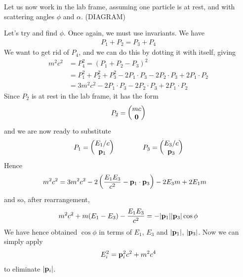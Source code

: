\documentclass{../../template/note}
\begin{document}
    Let us now work in the lab frame, assuming one particle is at rest, and with scattering angles \(\phi\) and \(\alpha\). (DIAGRAM) 
    
    Let's try and find \(\phi\). Once again, we must use invariants. We have
    \begin{align*}
        P_1 + P_2 = P_3 + P_4
    \end{align*}
    We want to get rid of \(P_4\), and we can do this by dotting it with itself, giving
    \begin{align*}
        m^2c^2 &= P_4^2 = (P_1 + P_2 - P_3)^2 \\
        &= P_1^2 + P_2^2 + P_3^2 - 2 P_1 \cdot P_3 - 2 P_2 \cdot P_3 + 2 P_1 \cdot P_2 \\
        &= 3m^2c^2 - 2 P_1 \cdot P_3 - 2 P_2 \cdot P_3 + 2 P_1 \cdot P_2
    \end{align*}
    Since \(P_2\) is at rest in the lab frame, it has the form
    \begin{align*}
        P_2 = \begin{pmatrix}
            mc \\
            \V 0 \\
        \end{pmatrix}
    \end{align*}
    and we are now ready to substitute
    \begin{align*}
        P_1 = \begin{pmatrix}
            E_1/c \\
            \V p_1 \\
        \end{pmatrix} \qquad \qquad P_3 = \begin{pmatrix}
            E_3/c \\
            \V p_3 \\
        \end{pmatrix}
    \end{align*}
    Hence
    \begin{align*}
        m^2c^2 &= 3m^2c^2 - 2 \left(\frac{E_1E_3}{c^2} - \V p_1 \cdot \V p_3\right) - 2 E_3m + 2E_1m
    \end{align*}
    and so, after rearrangement,
    \begin{align*}
        m^2c^2 + m(E_1-E_3) - \frac{E_1E_3}{c^2} = -|\V p_1||\V p_3| \cos \phi
    \end{align*}
    We have hence obtained \(\cos \phi\) in terms of \(E_1\), \(E_3\) and \(|\V p_1|\), \(|\V p_3|\). Now we can simply apply
    \begin{align*}
        E_i^2 = \V p_i^2 c^2 + m^2c^4
    \end{align*}
    to eliminate \(|\V p_i|\).
    
\end{document}
